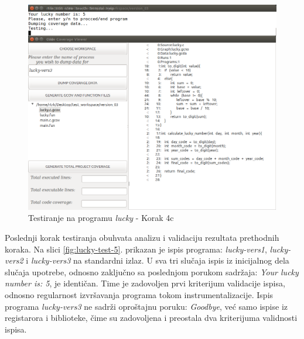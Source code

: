 \documentclass[12pt,oneside]{memoir}
\newcommand{\strano}[1]{\textit{#1}}
\begin{document}
\begin{figure}[!ht]
  \centering
  \includegraphics[width=\textwidth]{img/lucky4-ng.png}
  \caption{Testiranje na programu \strano{lucky} - Korak 4c}
  \label{fig:lucky-test-4}
\end{figure}

Poslednji korak testiranja obuhvata analizu i validaciju rezultata prethodnih koraka. Na slici \ref{fig:lucky-test-5}. prikazan je ispis programa: \strano{lucky-vers1}, \strano{lucky-vers2} i \strano{lucky-vers3} na standardni izlaz. U sva tri slučaja ispis iz inicijalnog dela slučaja upotrebe, odnosno zaključno sa poslednjom porukom sadržaja: \strano{Your lucky number is: 5}, je identičan. Time je zadovoljen prvi kriterijum validacije ispisa, odnosno regularnost izvršavanja programa tokom instrumentalizacije. Ispis programa \strano{lucky-vers3} ne sadrži oproštajnu poruku: \strano{Goodbye}, već samo ispise iz registarora i biblioteke, čime su zadovoljena i preostala dva kriterijuma validnosti ispisa. 
\end{document}
